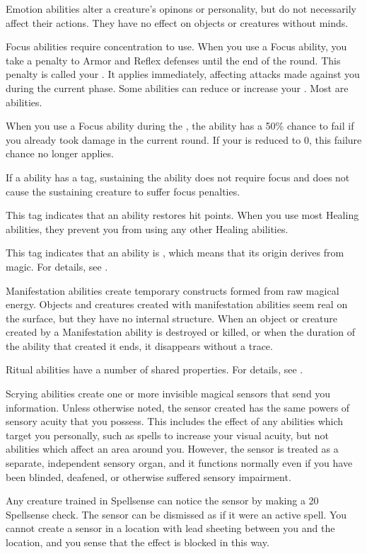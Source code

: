 Emotion abilities alter a creature's opinons or personality, but do not necessarily affect their actions.
They have no effect on objects or creatures without minds.

\label{Focus} Focus abilities require concentration to use.
When you use a Focus ability, you take a  penalty to Armor and Reflex defenses until the end of the round.
This penalty is called your .
It applies immediately, affecting attacks made against you during the current phase.
Some abilities can reduce or increase your .
Most  are  abilities.

When you use a Focus ability during the , the ability has a 50\% chance to fail if you already took damage in the current round.
If your  is reduced to 0, this failure chance no longer applies.

If a  ability has a  tag, sustaining the ability does not require focus and does not cause the sustaining creature to suffer focus penalties.

 This tag indicates that an ability restores hit points.
When you use most Healing abilities, they  prevent you from using any other Healing abilities.

 This tag indicates that an ability is , which means that its origin derives from magic.
For details, see .

 Manifestation abilities create temporary constructs formed from raw magical energy.
Objects and creatures created with manifestation abilities seem real on the surface, but they have no internal structure.
When an object or creature created by a Manifestation ability is destroyed or killed, or when the duration of the ability that created it ends, it disappears without a trace.

 Ritual abilities have a number of shared properties.
For details, see .

 Scrying abilities create one or more invisible magical sensors that send you information.
Unless otherwise noted, the sensor created has the same powers of sensory acuity that you possess.
This includes the effect of any abilities which target you personally, such as spells to increase your visual acuity, but not abilities which affect an area around you.
However, the sensor is treated as a separate, independent sensory organ, and it functions normally even if you have been blinded, deafened, or otherwise suffered sensory impairment.
\par Any creature trained in Spellsense can notice the sensor by making a  20 Spellsense check.
The sensor can be dismissed as if it were an active spell.
You cannot create a sensor in a location with lead sheeting between you and the location, and you sense that the effect is blocked in this way.

